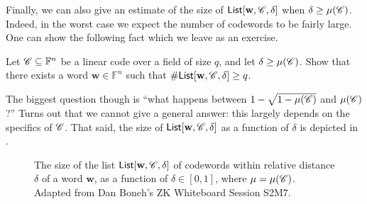 \documentclass[../../book]{subfiles}
\begin{document}
Finally, we can also give an estimate of the size of $\mathsf{List}[\mathbf{w},\mathscr{C},\delta]$ when $\delta \geq \mu(\mathscr{C})$.
Indeed, in the worst case we expect the number of codewords to be fairly large. 
One can show the following fact which we leave as an exercise.

\begin{exercise}
  Let $\mathscr{C} \subseteq \mathbb{F}^n$ be a linear code over a field of size $q$, and let $\delta \geq \mu(\mathscr{C})$.
  Show that there exists a word $\mathbf{w} \in \mathbb{F}^n$ such that $\#\mathsf{List}[\mathbf{w}, \mathscr{C}, \delta] \geq q$.
\end{exercise}

The biggest question though is ``what happens between $1-\sqrt{1-\mu(\mathscr{C})}$ and $\mu(\mathscr{C})$?''
Turns out that we cannot give a general answer: this largely depends on the specifics of $\mathscr{C}$.
That said, the size of $\mathsf{List}[\mathbf{w}, \mathscr{C}, \delta]$ as a function of $\delta$ is depicted in .

\begin{figure}[ht]
    \centering
    \caption{The size of the list $\mathsf{List}[\mathbf{w}, \mathscr{C}, \delta]$ of codewords within relative distance $\delta$ of a word $\mathbf{w}$, as a function of $\delta \in [0, 1]$, where $\mu = \mu(\mathscr{C})$. Adapted from Dan Boneh's ZK Whiteboard Session S2M7.}
    \label{fig:list-size}
\end{figure}
 
\end{document}
